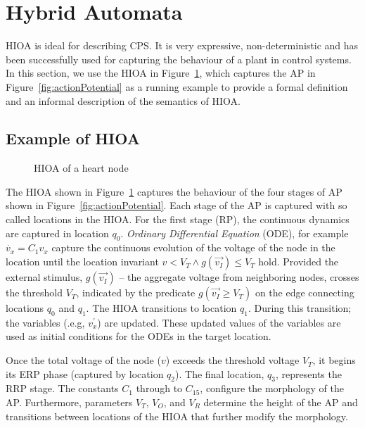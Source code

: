 \section{Hybrid Automata}
\label{sec:HA}


\acf{HIOA} is ideal for describing \ac{CPS}. It is very expressive,
non-deterministic and has been successfully used for capturing the
behaviour of a plant in control systems.  In this section, we use the
\ac{HIOA} in Figure~\ref{fig:heartCellHA}, which captures the \ac{AP} in
Figure~\ref{fig:actionPotential} as a running example to provide a
formal definition and an informal description of the semantics of
\ac{HIOA}.



\subsection{Example of \acf{HIOA} }

\begin{figure}
  \centering
  
  \caption{\acf{HIOA} of a heart node \label{fig:heartCellHA}}
\end{figure}

The \ac{HIOA} shown in Figure~\ref{fig:heartCellHA} captures the
behaviour of the four stages of \ac{AP} shown in
Figure~\ref{fig:actionPotential}. Each stage of the \ac{AP} is captured
with so called locations in the \ac{HIOA}. For the first stage
(\ac{RP}), the continuous dynamics are captured in location
$q_0$. \textit{Ordinary Differential Equation} (ODE), for example
\mbox{$\dot{v_{x}} = C_{1}v_{x}$} capture the continuous evolution of
the voltage of the node in the location until the location invariant
$v < V_{T} \wedge g(\vec{v_{I}}) \leq V_{T}$ hold. Provided the external
stimulus, $g(\vec{v_{I}})$ -- the aggregate voltage from neighboring
nodes, crosses the threshold $V_{T}$, indicated by the predicate
\mbox{$g(\vec{v_{I}} \geq V_{T})$} on the edge connecting locations $q_{0}$
and $q_{1}$. The \ac{HIOA} transitions to location $q_{1}$. During this
transition; the variables (.e.g, $v^{\prime}_{x}$) are updated. These
updated values of the variables are used as initial conditions for the
ODEs in the target location.

Once the total voltage of the node ($v$) exceeds the threshold voltage
$V_{T}$, it begins its \ac{ERP} phase (captured by location $q_2$). The
final location, $q_3$, represents the \ac{RRP} stage.  The constants
$C_1$ through to $C_{15}$, configure the morphology of the
\ac{AP}. Furthermore, parameters $V_T$, $V_O$, and $V_R$ determine the
height of the \ac{AP} and transitions between locations of the \ac{HIOA}
that further modify the morphology.

